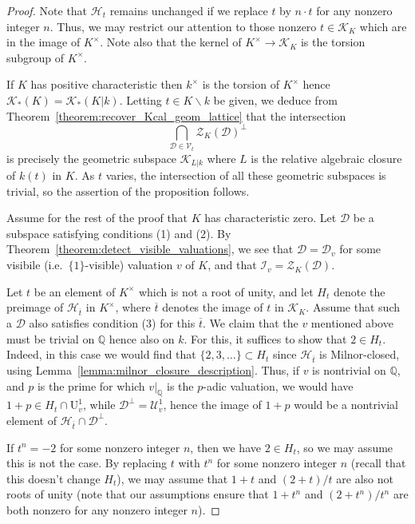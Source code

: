 \documentclass[12pt]{amsart}
\newcommand{\Qbb}{\mathbb{Q}}
\newcommand{\smin}{\smallsetminus}
\newcommand{\Urm}{\mathrm{U}}
\newcommand{\Vscr}{\mathscr{V}}
\newcommand{\Zcal}{\mathcal{Z}}
\newcommand{\Dcal}{\mathcal{D}}
\newcommand{\Ical}{\mathcal{I}}
\newcommand{\Hcal}{\mathcal{H}}
\newcommand{\Ucal}{\mathcal{U}}
\newcommand{\Kcal}{\mathcal{K}}
\renewcommand{\bar}{\overline}
\theoremstyle{definition}
\begin{document}
\begin{proof}
  Note that $\Hcal_{t}$ remains unchanged if we replace $t$ by $n \cdot t$ for any nonzero integer $n$.
  Thus, we may restrict our attention to those nonzero $t \in \Kcal_{K}$ which are in the image of $K^{\times}$.
  Note also that the kernel of $K^{\times} \to \Kcal_{K}$ is the torsion subgroup of $K^{\times}$.

  If $K$ has positive characteristic then $k^{\times}$ is the torsion of $K^{\times}$ hence $\Kcal_{*}(K) = \Kcal_{*}(K|k)$.
  Letting $t \in K \smin k$ be given, we deduce from Theorem~\ref{theorem:recover_Kcal_geom_lattice} that the intersection
  \[ \bigcap_{\Dcal \in \Vscr_{t}} \Zcal_{K}(\Dcal)^{\perp} \]
  is precisely the geometric subspace $\Kcal_{L|k}$ where $L$ is the relative algebraic closure of $k(t)$ in $K$.
  As $t$ varies, the intersection of all these geometric subspaces is trivial, so the assertion of the proposition follows.

  Assume for the rest of the proof that $K$ has characteristic zero.
  Let $\Dcal$ be a subspace satisfying conditions (1) and (2).
  By Theorem~\ref{theorem:detect_visible_valuations}, we see that $\Dcal = \Dcal_{v}$ for some visibile (i.e.~$\{1\}$-visible) valuation $v$ of $K$, and that $\Ical_{v} = \Zcal_{K}(\Dcal)$.

  Let $t$ be an element of $K^{\times}$ which is not a root of unity, and let $H_{t}$ denote the preimage of $\Hcal_{\bar t}$ in $K^{\times}$, where $\bar t$ denotes the image of $t$ in $\Kcal_{K}$.
  Assume that such a $\Dcal$ also satisfies condition (3) for this $\bar t$.
  We claim that the $v$ mentioned above must be trivial on $\Qbb$ hence also on $k$.
  For this, it suffices to show that $2 \in H_{t}$.
  Indeed, in this case we would find that $\{2,3,\ldots\} \subset H_{t}$ since $\Hcal_{\bar t}$ is Milnor-closed, using Lemma~\ref{lemma:milnor_closure_description}.
  Thus, if $v$ is nontrivial on $\Qbb$, and $p$ is the prime for which $v|_{\Qbb}$ is the $p$-adic valuation, we would have $1 + p \in H_{t} \cap \Urm_{v}^{1}$, while $\Dcal^{\perp} = \Ucal_{v}^{1}$, hence the image of $1+p$ would be a nontrivial element of $\Hcal_{\bar t} \cap \Dcal^{\perp}$.

  If $t^{n} = -2$ for some nonzero integer $n$, then we have $2 \in H_{t}$, so we may assume this is not the case.
  By replacing $t$ with $t^{n}$ for some nonzero integer $n$ (recall that this doesn't change $H_{t}$), we may assume that $1+t$ and $(2+t)/t$ are also not roots of unity (note that our assumptions ensure that $1+t^{n}$ and $(2+t^{n})/t^{n}$ are both nonzero for any nonzero integer $n$).


\end{proof}
\end{document}
